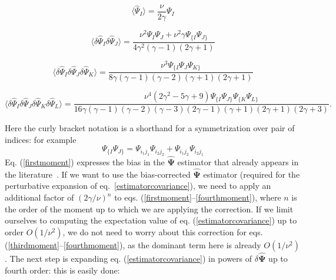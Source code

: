 \documentclass[reprint,aps,prd,superscriptaddress,showkeys,showpacs]{revtex4-1}
\newcommand{\bbh}[1]{\mathbf{\hat{#1}}}
\newcommand{\h}[1]{\hat{#1}}
\begin{document}
\begin{widetext}

\begin{equation}
\label{firstmoment}
\langle\h{\Psi}_I\rangle = \frac{\nu}{2\gamma}\Psi_I
\end{equation}

\begin{equation}
\label{secondmoment}
\langle\delta\h{\Psi}_I\delta\h{\Psi}_J\rangle = \frac{\nu^2\Psi_I\Psi_J + \nu^2\gamma\Psi_{\{I}\Psi_{J\}}}{4\gamma^2(\gamma-1)(2\gamma+1)}
\end{equation}

\begin{equation}
\label{thirdmoment}
\langle\delta\h{\Psi}_I\delta\h{\Psi}_J\delta\h{\Psi}_K\rangle = \frac{\nu^3\Psi_{\{I}\Psi_J\Psi_{K\}}}{8\gamma(\gamma-1)(\gamma-2)(\gamma+1)(2\gamma+1)}
\end{equation}

\begin{equation}
\label{fourthmoment}
\langle\delta\h{\Psi}_I\delta\h{\Psi}_J\delta\h{\Psi}_K\delta\h{\Psi}_L\rangle = \frac{\nu^4(2\gamma^2-5\gamma+9)\Psi_{\{I}\Psi_{J\}}\Psi_{\{K}\Psi_{L\}}}{16\gamma(\gamma-1)(\gamma-2)(\gamma-3)(2\gamma-1)(\gamma+1)(2\gamma+1)(2\gamma+3)}.
\end{equation}

\end{widetext}
%
Here the curly bracket notation is a shorthand for a symmetrization over pair of indices: for example
\begin{equation}
\Psi_{\{I}\Psi_{J\}} = \Psi_{i_1j_1}\Psi_{i_2j_2} + \Psi_{i_1j_2}\Psi_{i_2j_1}
\end{equation}
%
Eq. (\ref{firstmoment}) expresses the bias in the $\bbh{\Psi}$
estimator that already appears in the literature~\citep{Hartlap07}. If
we want to use the bias-corrected $\bbh{\Psi}$ estimator (required for
the perturbative expansion of eq.~\ref{estimatorcovariance}), we need
to apply an additional factor of $(2\gamma/\nu)^n$ to
eqs. (\ref{firstmoment}--\ref{fourthmoment}), where $n$ is the order
of the moment up to which we are applying the correction. If we limit
ourselves to computing the expectation value of
eq. (\ref{estimatorcovariance}) up to order $O(1/\nu^2)$, we do not
need to worry about this correction for
eqs. (\ref{thirdmoment}--\ref{fourthmoment}), as the dominant term
here is already $O(1/\nu^2)$. The next step is expanding
eq. (\ref{estimatorcovariance}) in powers of $\delta\bbh{\Psi}$ up to
fourth order: this is easily done:
\end{document}
